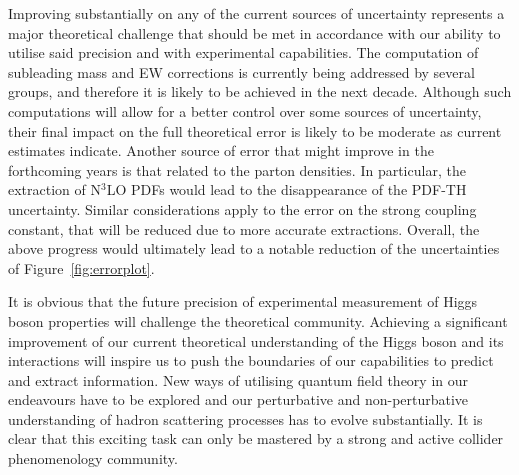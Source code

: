 \label{sec:hl-lhc-ggF}
Improving substantially on any of the current
sources of uncertainty represents a major theoretical challenge that
should be met in accordance with our ability to utilise said precision
and with experimental capabilities. 
The computation of subleading mass and EW corrections is
currently being addressed by several groups, and therefore it is
likely to be achieved in the next decade. Although such computations
will allow for a better control over some sources of uncertainty,
their final impact on the full theoretical error is likely to be
moderate as current estimates indicate.
Another source of error that might improve in the forthcoming years is
that related to the parton densities. In particular, the extraction of
N$^3$LO PDFs would lead to the disappearance of the PDF-TH
uncertainty. Similar considerations apply to the error on the strong
coupling constant, that will be reduced due to more accurate
extractions. Overall, the above progress would ultimately lead to a
notable reduction of the uncertainties of Figure~\ref{fig:errorplot}.

It is obvious that the future precision of experimental measurement of Higgs boson properties will challenge the theoretical community.
Achieving a significant improvement of our current theoretical understanding of the Higgs boson and its interactions will inspire us to push the boundaries of our capabilities to predict and extract information.
New ways of utilising quantum field theory in our endeavours have to be explored and our perturbative and non-perturbative understanding of hadron scattering processes has to evolve substantially. 
It is clear that this exciting task can only be mastered by a strong and active collider phenomenology community.
 

\label{sec:hl-lhc-VBF}

